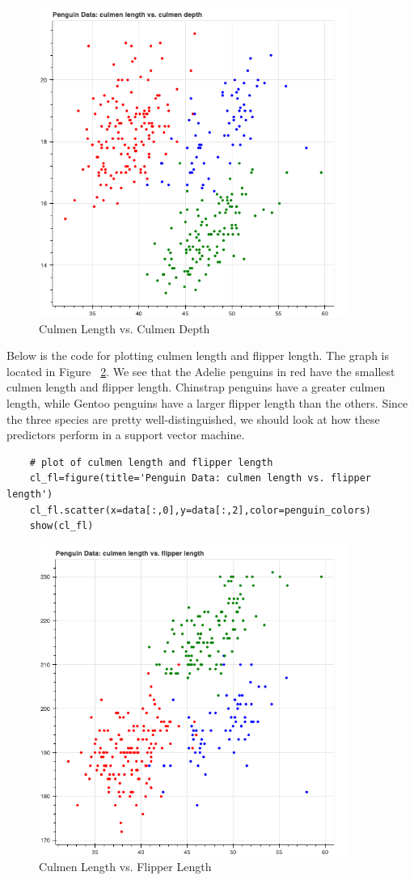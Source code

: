\documentclass[12pt]{article}
\begin{document}
\begin{figure}[H]
    \centering
    \includegraphics[width=4in]{Figures/penguins/cl_cd.png}
    \caption{Culmen Length vs. Culmen Depth}
    \label{fig_cl_cd}
\end{figure}

Below is the code for plotting culmen length and flipper length. The graph is located in Figure ~\ref{fig_cl_fl}. We see that the Adelie penguins in red have the smallest culmen length and flipper length. Chinstrap penguins have a greater culmen length, while Gentoo penguins have a larger flipper length than the others. Since the three species are pretty well-distinguished, we should look at how these predictors perform in a support vector machine.

\begin{verbatim}
    # plot of culmen length and flipper length
    cl_fl=figure(title='Penguin Data: culmen length vs. flipper length')
    cl_fl.scatter(x=data[:,0],y=data[:,2],color=penguin_colors)
    show(cl_fl)
\end{verbatim}

\begin{figure}[H]
    \centering
    \includegraphics[width=4in]{Figures/penguins/cl_fl.png}
    \caption{Culmen Length vs. Flipper Length}
    \label{fig_cl_fl}
\end{figure}
\end{document}
